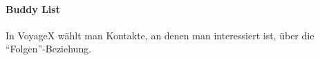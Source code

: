 \paragraph{Buddy List}
In VoyageX wählt man Kontakte, an denen man interessiert ist, über die "`Folgen"'-Beziehung.




